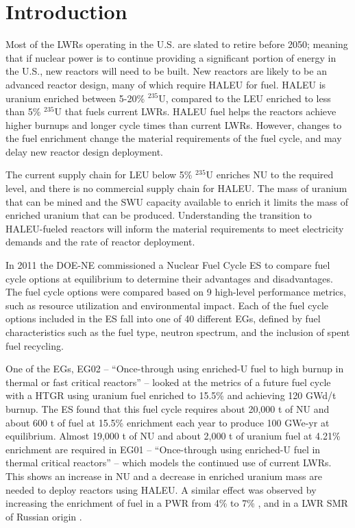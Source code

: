 \section{Introduction}

Most of the \glspl{LWR} operating in the U.S. are slated to retire
before 2050; meaning that if nuclear power is to continue providing a 
significant portion of energy in the U.S., new reactors will need to be built. 
New reactors are likely to be an advanced reactor design, many of 
which require \gls{HALEU} for fuel. \gls{HALEU} is uranium  
enriched between 5-20\% $^{235}$U, compared to the \gls{LEU} enriched to 
less than 5\% $^{235}$U that fuels current \glspl{LWR}. \gls{HALEU} fuel helps 
the reactors achieve higher burnups and longer cycle times than current 
\glspl{LWR}. However, changes to the fuel enrichment change the material 
requirements of the fuel cycle, and may delay 
new reactor design deployment.

The current supply chain for \gls{LEU} below 5\% $^{235}$U 
enriches \gls{NU} to the required level, and there is no commercial 
supply chain for \gls{HALEU}.  
The mass of uranium that can be mined and the \gls{SWU} capacity available 
to enrich it limits the mass of enriched uranium that can be 
produced. Understanding 
the transition to \gls{HALEU}-fueled reactors will inform the material 
requirements to meet electricity demands and 
the rate of reactor deployment.

In 2011 the \gls{DOE-NE} commissioned a Nuclear Fuel Cycle \gls{ES} 
\cite{wigeland_nuclear_2014} to compare fuel cycle options at equilibrium
to determine their advantages and disadvantages. The fuel cycle options were 
compared 
based on 9 high-level performance metrics, such as resource utilization and 
environmental impact. Each of the fuel cycle options included in the 
\gls{ES} fall into one of 40 different \glspl{EG}, defined by fuel 
characteristics such as the fuel type, neutron spectrum, and the inclusion 
of spent fuel recycling. 

One of the \glspl{EG}, \gls{EG}02 -- ``Once-through using enriched-U fuel to 
high burnup in thermal or fast critical reactors'' -- looked at the metrics 
of a future fuel cycle with a \gls{HTGR} using uranium fuel enriched to 
15.5\% and achieving 120 GWd/t burnup. The \gls{ES} found that this fuel cycle
requires about 20,000 t of \gls{NU} and about 600 t of fuel at 15.5\% 
enrichment each year 
to produce 100 GWe-yr at equilibrium. Almost 19,000 t of \gls{NU} and 
about 2,000 t of uranium fuel at 4.21\%
enrichment are required in \gls{EG}01 -- ``Once-through using enriched-U 
fuel in thermal critical reactors'' -- which models the continued use of current 
\glspl{LWR}. This shows an increase in \gls{NU} and a decrease in enriched uranium 
mass are needed to deploy reactors using \gls{HALEU}.
A similar effect was observed by increasing the enrichment of fuel in a 
\gls{PWR} from 4\% to 7\% \cite{burns_reactor_2020}, and in a \gls{LWR}
\gls{SMR} of Russian origin \cite{hernandez_potential_2020}. 

